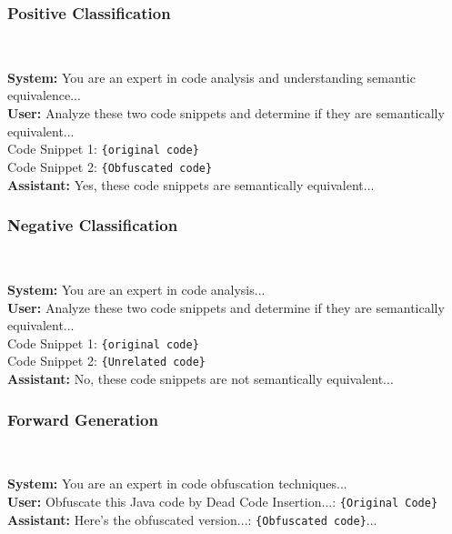 \subsubsection{Positive Classification}~\\
\begin{tcolorbox}[colback=green!5, colframe=green!25, coltitle=black, title=Positive Pair, boxrule=0.4pt, left=2pt, right=2pt, top=2pt, bottom=2pt, fontupper=\small]
\textbf{System:} You are an expert in code analysis and understanding semantic equivalence...\\
\textbf{User:} Analyze these two code snippets and determine if they are semantically equivalent...\\
Code Snippet 1: \texttt{\{original code\}}\\
Code Snippet 2: \texttt{\{Obfuscated code\}}\\
\textbf{Assistant:} Yes, these code snippets are semantically equivalent...
\end{tcolorbox}

\subsubsection{Negative Classification}~\\
\begin{tcolorbox}[colback=orange!5, colframe=orange!25, coltitle=black, title=Negative Pair, boxrule=0.4pt, left=2pt, right=2pt, top=2pt, bottom=2pt, fontupper=\small]
\textbf{System:} You are an expert in code analysis...\\
\textbf{User:} Analyze these two code snippets and determine if they are semantically equivalent...\\
Code Snippet 1: \texttt{\{original code\}}\\
Code Snippet 2: \texttt{\{Unrelated code\}}\\
\textbf{Assistant:} No, these code snippets are not semantically equivalent...
\end{tcolorbox}

\subsubsection{Forward Generation}~\\
\begin{tcolorbox}[colback=blue!5, colframe=blue!25, coltitle=black, title=Generation Task, boxrule=0.4pt, left=2pt, right=2pt, top=2pt, bottom=2pt, fontupper=\small]
\textbf{System:} You are an expert in code obfuscation techniques...\\
\textbf{User:} Obfuscate this Java code by Dead Code Insertion...: \texttt{\{Original Code\}}\\
\textbf{Assistant:} Here's the obfuscated version...: \texttt{\{Obfuscated code\}}...
\end{tcolorbox}

